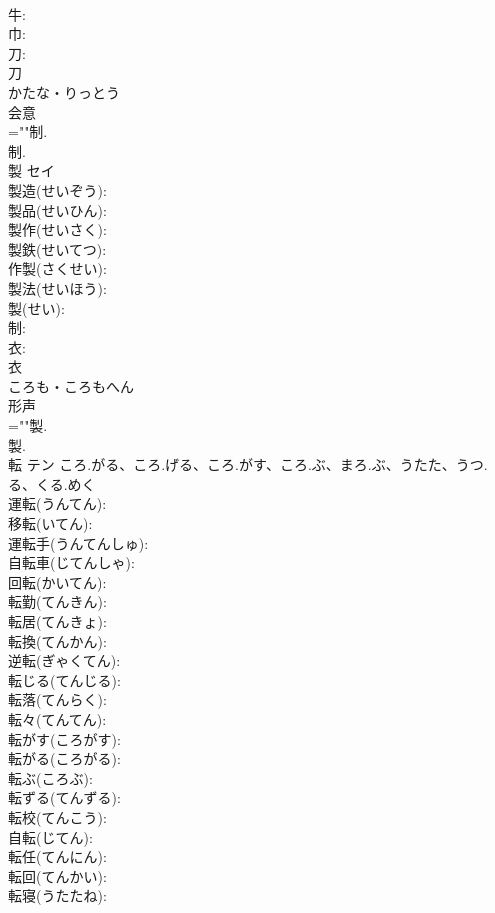 \documentclass[8pt]{extreport}
\begin{document}
\begin{CJK}{UTF8}{min}
\\	牛: 
\\	巾: 
\\	刀: 
\\	刀	
\\	かたな・りっとう	
\\	会意 
\\	=""制.
\\	制.
\\	製	セイ			
\\	製造(せいぞう): 
\\	製品(せいひん): 
\\	製作(せいさく): 
\\	製鉄(せいてつ): 
\\	作製(さくせい): 
\\	製法(せいほう): 
\\	製(せい): 
\\	制: 
\\	衣: 
\\	衣	
\\	ころも・ころもへん	
\\	形声 
\\	=""製.
\\	製.
\\	転	テン	ころ.がる、ころ.げる、ころ.がす、ころ.ぶ、まろ.ぶ、うたた、うつ.る、くる.めく		
\\	運転(うんてん): 
\\	移転(いてん): 
\\	運転手(うんてんしゅ): 
\\	自転車(じてんしゃ): 
\\	回転(かいてん): 
\\	転勤(てんきん): 
\\	転居(てんきょ): 
\\	転換(てんかん): 
\\	逆転(ぎゃくてん): 
\\	転じる(てんじる): 
\\	転落(てんらく): 
\\	転々(てんてん): 
\\	転がす(ころがす): 
\\	転がる(ころがる): 
\\	転ぶ(ころぶ): 
\\	転ずる(てんずる): 
\\	転校(てんこう): 
\\	自転(じてん): 
\\	転任(てんにん): 
\\	転回(てんかい): 
\\	転寝(うたたね): 

\end{CJK}
\end{document}
